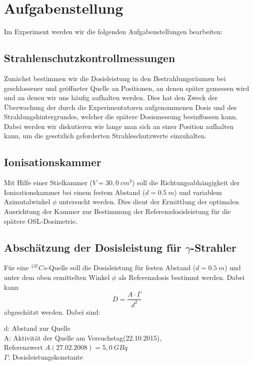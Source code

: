 \section{Aufgabenstellung}
Im Experiment werden wir die folgenden Aufgabenstellungen bearbeiten:
\subsection{Strahlenschutzkontrollmessungen}
Zunächst bestimmen wir die Dosisleistung in den Bestrahlungsräumen bei geschlossener und geöffneter Quelle an Positionen, an denen später gemessen wird und an denen wir uns häufig aufhalten werden. Dies hat den Zweck der Überwachung der durch die Experimentatoren aufgenommenen Dosis und des Strahlungshintergrundes, welcher die spätere Dosismessung beeinflussen kann. Dabei werden wir diskutieren wie lange man sich an einer Position aufhalten kann, um die gesetzlich geforderten Strahleschutzwerte einzuhalten.

\subsection{Ionisationskammer}
Mit Hilfe einer Stielkammer ($V = 30,0\ cm^3$) soll die Richtungsabhängigkeit der Ionisationskammer bei einem festem Abstand ($d=0.5\ m$) und variablem Azimutalwinkel $\phi$ untersucht werden.
Dies dient der Ermittlung der optimalen Ausrichtung der Kammer zur Bestimmung der Referenzdosisleistung für die spätere OSL-Dosimetrie.

\subsection{Abschätzung der Dosisleistung für $\gamma$-Strahler}
Für eine $^{137}Cs$-Quelle soll die Dosisleistung für festen Abstand ($d=0.5\ m$) und unter dem oben ermittelten Winkel $\phi$ als Referenzdosis bestimmt werden. Dabei kann
\begin{equation}
	\dot{D}=\frac{A \cdot \Gamma}{d^2}
\end{equation}
abgeschätzt werden. Dabei sind:
\begin{center}
\begin{minipage}{.9\textwidth}
	d: Abstand zur Quelle\\
	A: Aktivität der Quelle am Versuchstag(22.10.2015), \\
	Referenzwert $A(27.02.2008) = 5,0\ GBq$\\
	$\Gamma$: Dosisleistungskonstante
	
\end{minipage}
\end{center}

